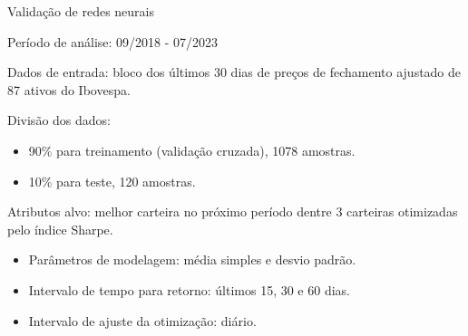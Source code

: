     \begin{frame}{Validação de redes neurais}

        Período de análise: 09/2018 - 07/2023

        Dados de entrada: bloco dos últimos 30 dias de preços de fechamento ajustado de 87 ativos do Ibovespa.

        Divisão dos dados:

        \begin{itemize}
            \item 90\% para treinamento (validação cruzada), 1078 amostras.
            \item 10\% para teste, 120 amostras.
        \end{itemize}

        Atributos alvo: melhor carteira no próximo período dentre 3 carteiras otimizadas pelo índice Sharpe.

        \begin{itemize}
            \item Parâmetros de modelagem: média simples e desvio padrão.
            \item Intervalo de tempo para retorno: últimos 15, 30 e 60 dias.
            \item Intervalo de ajuste da otimização: diário.
        \end{itemize}
        
    \end{frame}

